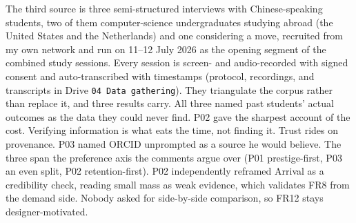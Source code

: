 The third source is three semi-structured interviews with Chinese-speaking students, two of them computer-science undergraduates studying abroad (the United States and the Netherlands) and one considering a move, recruited from my own network and run on 11--12 July 2026 as the opening segment of the combined study sessions. Every session is screen- and audio-recorded with signed consent and auto-transcribed with timestamps (protocol, recordings, and transcripts in Drive \texttt{04 Data gathering}). They triangulate the corpus rather than replace it, and three results carry. All three named past students' actual outcomes as the data they could never find. P02 gave the sharpest account of the cost. Verifying information is what eats the time, not finding it. Trust rides on provenance. P03 named ORCID unprompted as a source he would believe. The three span the preference axis the comments argue over (P01 prestige-first, P03 an even split, P02 retention-first). P02 independently reframed Arrival as a credibility check, reading small mass as weak evidence, which validates FR8 from the demand side. Nobody asked for side-by-side comparison, so FR12 stays designer-motivated.

